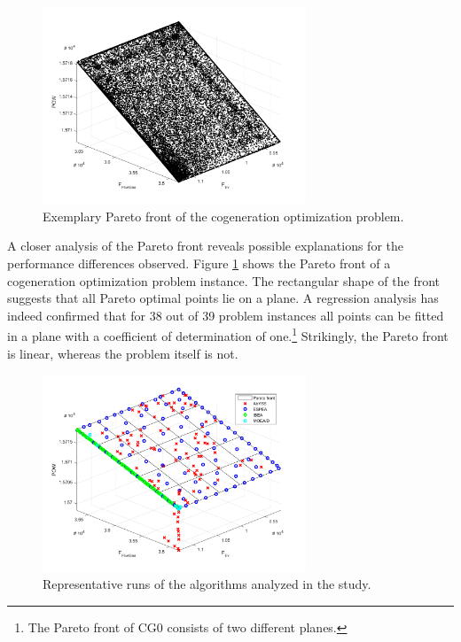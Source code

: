 \begin{figure}
\centering
\includegraphics[width=0.7\textwidth]{figures/paretofront.pdf}
\caption{Exemplary Pareto front of the cogeneration optimization problem.}
\label{fig:paretofront}
\end{figure}

A closer analysis of the Pareto front reveals possible explanations for the performance differences observed. Figure \ref{fig:paretofront} shows the Pareto front of a cogeneration optimization problem instance. The rectangular shape of the front suggests that all Pareto optimal points lie on a plane. A regression analysis has indeed confirmed that for 38 out of 39 problem instances all points can be fitted in a plane with a coefficient of determination of one.\footnote{The Pareto front of CG0 consists of two different planes.} Strikingly, the Pareto front is linear, whereas the problem itself is not.

\begin{figure}
\centering
\includegraphics[width=0.7\textwidth]{figures/example1.pdf}
\caption{Representative runs of the algorithms analyzed in the study.}
\label{fig:exruns1}
\end{figure}

